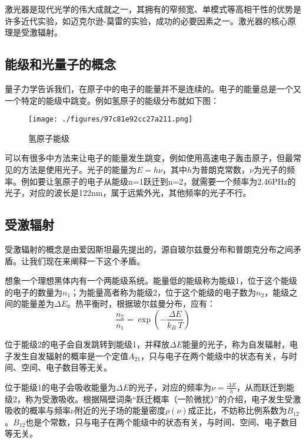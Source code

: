 
\begin{issues}
\issueDraft
\issueTODO
\end{issues}

激光器是现代光学的伟大成就之一，其拥有的窄频宽、单模式等高相干性的优势是许多近代实验，如迈克尔逊-莫雷的实验，成功的必要因素之一。激光器的核心原理是受激辐射。

\subsection{能级和光量子的概念}
量子力学告诉我们，在原子中的电子的能量并不是连续的。电子的能量总是一个又一个特定的能级中跳变。例如氢原子的能级分布就如下图：\begin{figure}[ht]
\centering
\texttt{[image: ./figures/97c81e92cc27a211.png]}
\caption{氢原子能级} \label{fig_LaserT_1}
\end{figure}
可以有很多中方法来让电子的能量发生跳变，例如使用高速电子轰击原子，但最常见的方法是使用光子。光子的能量为$E=h\nu$，其中$h$为普朗克常数，$\nu$为光子的频率。例如要让氢原子的电子从能级n=1跃迁到n=2，就需要一个频率为2.46PHz的光子，对应的波长是122nm，属于远紫外光，其他频率的光子不行。
\subsection{受激辐射}
受激辐射的概念是由爱因斯坦最先提出的，源自玻尔兹曼分布和普朗克分布之间矛盾。让我们现在来阐释一下这个矛盾。

想象一个理想黑体内有一个两能级系统。能量低的能级称为能级1，位于这个能级的电子的数量为$n_1$；为能量高者称为能级2，位于这个能级的电子数为$n_2$，能级之间的能量差为$\Delta E$。热平衡时，根据玻尔兹曼分布，应有：
\begin{equation}
\frac{n_2}{n_1}=\exp(-\frac{\Delta E}{k_B \ T})
\end{equation}

位于能级2的电子会自发跳转到能级1，并释放$\Delta E$能量的光子，称为自发辐射，电子发生自发辐射的概率是一个定值$A_{21}$，只与电子在两个能级中的状态有关，与时间、空间、电子数目等无关。

位于能级1的电子会吸收能量为$\Delta E$的光子，对应的频率为$\nu=\frac{\Delta E}{h}$，从而跃迁到能级2，称为受激吸收。根据隔壁词条“跃迁概率（一阶微扰）”的介绍，电子发生受激吸收的概率与频率$\nu$附近的光子场的能量密度$\rho(\nu)$成正比，不妨称比例系数为$B_{12}$。$B_{12}$也是个常数，只与电子在两个能级中的状态有关，与时间、空间、电子数目等无关。

